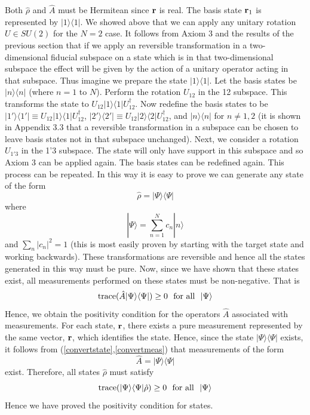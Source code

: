 \documentclass[10pt,twocolumn]{article}
\begin{document}
Both $\hat{\rho}$ and $\hat{A}$ must be Hermitean since $\bf r$ is real.
The basis state ${\bf r}_1$ is represented by
$|1\rangle\langle 1|$.  We showed above that we can apply any unitary
rotation $U\in SU(2)$ for the $N=2$ case. It follows from Axiom 3 and
the results of the previous section that
if we apply an reversible transformation in a two-dimensional fiducial
subspace on a state which is in that two-dimensional
subspace the effect will be given by the action of a unitary operator
acting in that subspace.
Thus imagine we prepare the state $|1\rangle\langle 1|$.  Let the basis
states be $|n\rangle\langle n|$ (where $n=1$ to $N$). Perform the
rotation $U_{12}$ in the 12 subspace.  This transforms the state to
$U_{12}|1\rangle\langle 1 |U_{12}^\dagger$. Now redefine the basis
states to be $|1'\rangle\langle 1'|\equiv
U_{12}|1\rangle\langle 1 |U_{12}^\dagger$,
$|2'\rangle\langle 2'|\equiv
U_{12}|2\rangle\langle 2 |U_{12}^\dagger$, and
$|n\rangle\langle n|$ for $n\not=1,2$ (it is shown in Appendix 3.3 that
a reversible transformation in a subspace can be chosen to leave basis
states not in that subspace unchanged).  Next, we consider a rotation
$U_{1'3}$ in the 1'3 subspace.  The state will only have support in this
subspace and so Axiom 3 can be applied again.  The basis states can be
redefined again.  This process can be repeated. In this way it is easy
to prove we can generate any state of the form
\begin{equation}
\hat{\rho}=|\Psi\rangle\langle\Psi |
\end{equation}
where
\begin{equation}
|\Psi\rangle=\sum_{n=1}^N c_n|n\rangle
\end{equation}
and $\sum_n |c_n|^2=1$ (this is most easily proven by starting with the
target state and working backwards).
These transformations are reversible and hence all
the states generated in this way must be pure.  Now, since we have shown
that these states exist, all measurements performed on these states must
be non-negative.  That is
\begin{equation}
{\rm trace}(\hat{A} |\Psi\rangle\langle\Psi | ) \geq 0 ~~{\rm for ~ all}~~
|\Psi\rangle
\end{equation}
Hence, we obtain the positivity condition for the operators $\hat{A}$
associated with measurements.
For each state, ${\bf r}$, there exists a pure measurement represented
by the same
vector, ${\bf r}$, which identifies the state.  Hence, since the state
$|\Psi\rangle\langle\Psi |$
exists, it follows from (\ref{convertstate},\ref{convertmeas}) that
measurements of the form
\begin{equation}
\hat{A}=|\Psi\rangle\langle\Psi |
\end{equation}
exist.  Therefore, all states $\hat{\rho}$ must satisfy
\begin{equation}
{\rm trace}(|\Psi\rangle\langle\Psi |\hat{\rho} ) \geq 0 ~~{\rm for ~ all}~~
|\Psi\rangle
\end{equation}
Hence we have proved the positivity condition for states.
\end{document}

